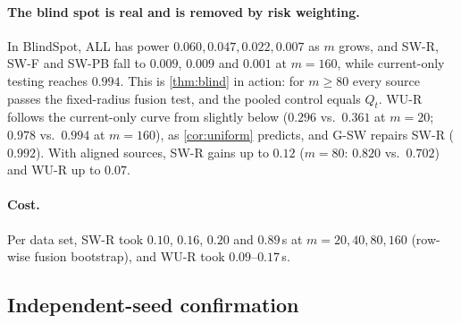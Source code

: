 \paragraph{The blind spot is real and is removed by risk weighting.} In BlindSpot, ALL has power $0.060,0.047,0.022,0.007$ as $m$ grows, and SW-R, SW-F and SW-PB fall to $0.009$, $0.009$ and $0.001$ at $m=160$, while current-only testing reaches $0.994$. This is \cref{thm:blind} in action: for $m\ge80$ every source passes the fixed-radius fusion test, and the pooled control equals $Q_t$. WU-R follows the current-only curve from slightly below ($0.296$ vs.\ $0.361$ at $m=20$; $0.978$ vs.\ $0.994$ at $m=160$), as \cref{cor:uniform} predicts, and G-SW repairs SW-R ($0.992$). With aligned sources, SW-R gains up to $0.12$ ($m=80$: $0.820$ vs.\ $0.702$) and WU-R up to $0.07$.

\paragraph{Cost.} Per data set, SW-R took $0.10$, $0.16$, $0.20$ and $0.89$\,s at $m=20,40,80,160$ (row-wise fusion bootstrap), and WU-R took $0.09$--$0.17$\,s.

\subsection{Independent-seed confirmation}\label{sec:confirm}
